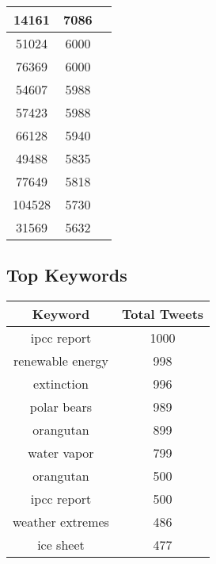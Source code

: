 \documentclass{article}\usepackage[T1]{fontenc}
\begin{document}
\begin{tabular}{|c|c|c|}
 \hline
14161 & 7086\\ 
 \hline
51024 & 6000\\ 
 \hline
76369 & 6000\\ 
 \hline
54607 & 5988\\ 
 \hline
57423 & 5988\\ 
 \hline
66128 & 5940\\ 
 \hline
49488 & 5835\\ 
 \hline
77649 & 5818\\ 
 \hline
104528 & 5730\\ 
 \hline
31569 & 5632\\ 
 \hline
\end{tabular}\subsection*{Top Keywords}\begin{tabular}{|c|c|}         \hline         Keyword & Total Tweets \\ 
 \hline
ipcc report & 1000\\ 
 \hline
renewable energy & 998\\ 
 \hline
extinction & 996\\ 
 \hline
polar bears & 989\\ 
 \hline
orangutan & 899\\ 
 \hline
water vapor & 799\\ 
 \hline
orangutan & 500\\ 
 \hline
ipcc report & 500\\ 
 \hline
weather extremes & 486\\ 
 \hline
ice sheet & 477\\ 
 \hline
\end{tabular}
\end{document}
